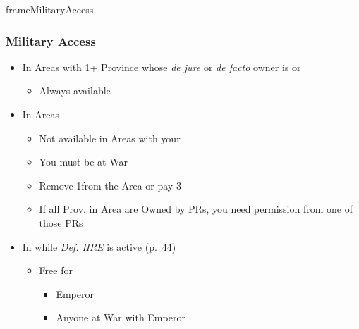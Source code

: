 \documentclass[10pt]{article}
\newlength{\fhMilitaryAccess} \setlength\fhMilitaryAccess{15\baselineskip}
\begin{document}
\begin{dynamiccontents*}{frameMilitaryAccess}\begin{eubox}{\fhMilitaryAccess}
	\subsubsection*{Military Access }
	\begin{itemize}
		\item In Areas with 1+ Province whose \emph{de jure} or \emph{de facto} owner is  or 
		\begin{itemize}
			\item Always available
		\end{itemize}
		\item In  Areas
		\begin{itemize}
			\item Not available in Areas with your \claims
			\item You must be at War
			\item Remove 1\influence from the Area or pay 3\ducats
			\item If all Prov. in Area are Owned by PRs, you need permission from one of those PRs
		\end{itemize}
		\item In  while \emph{Def. HRE} is active (p.~44)
		\begin{itemize}
			\item Free for
			\begin{itemize}
				\item Emperor
				\item Anyone at War with Emperor
			\end{itemize}
		\end{itemize}
	\end{itemize}
\end{eubox}\end{dynamiccontents*}
\end{document}

